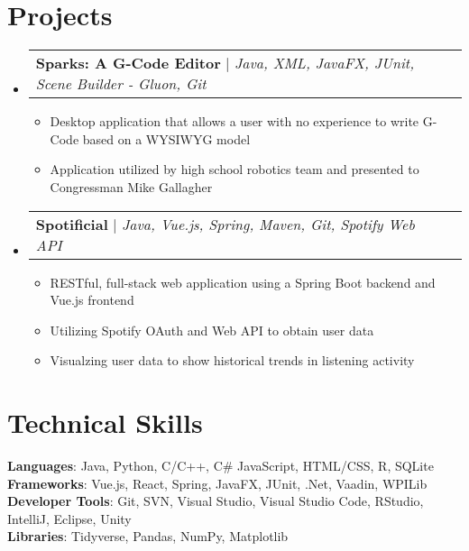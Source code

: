 \documentclass[letterpaper,11pt]{article}
\makeatletter
\newcommand{\resumeItem}[1]{
  \item\small{
    {#1 \vspace{-2pt}}
  }
}
\newcommand{\resumeProjectHeading}[2]{
    \item
    \begin{tabular*}{0.97\textwidth}{l@{\extracolsep{\fill}}r}
      \small#1 & #2 \\
    \end{tabular*}\vspace{-7pt}
}
\newcommand{\resumeSubHeadingListStart}{\begin{itemize}[leftmargin=0.15in, label={}]}
\newcommand{\resumeSubHeadingListEnd}{\end{itemize}}
\newcommand{\resumeItemListStart}{\begin{itemize}}
\newcommand{\resumeItemListEnd}{\end{itemize}\vspace{-5pt}}
\makeatother
\begin{document}
\section{{Projects}}
    \resumeSubHeadingListStart
      \resumeProjectHeading
          {\textbf{Sparks: A G-Code Editor} $|$ \emph{Java, XML, JavaFX, JUnit, Scene Builder - Gluon, Git}}{}
          \resumeItemListStart
            \resumeItem{Desktop application that allows a user with no experience to write G-Code based on a WYSIWYG model}
            \resumeItem{Application utilized by high school robotics team and presented to Congressman Mike Gallagher}
          \resumeItemListEnd
      \resumeProjectHeading
          {\textbf{Spotificial} $|$ \emph{Java, Vue.js, Spring, Maven, Git, Spotify Web API}}{}
          \resumeItemListStart
            \resumeItem{RESTful, full-stack web application using a Spring Boot backend and Vue.js frontend}
            \resumeItem{Utilizing Spotify OAuth and Web API to obtain user data}
            \resumeItem{Visualzing user data to show historical trends in listening activity}
          \resumeItemListEnd
    \resumeSubHeadingListEnd
%
\section{Technical Skills}
 \begin{itemize}[leftmargin=0.15in, label={}]
    \small{
    \item{
     \textbf{Languages}{: Java, Python, C/C++, C\# JavaScript, HTML/CSS, R, SQLite} \\
     \textbf{Frameworks}{: Vue.js, React, Spring, JavaFX, JUnit, .Net, Vaadin, WPILib} \\
     \textbf{Developer Tools}{: Git, SVN, Visual Studio, Visual Studio Code, RStudio, IntelliJ, Eclipse, Unity} \\
     \textbf{Libraries}{: Tidyverse, Pandas, NumPy, Matplotlib}
    }}
 \end{itemize}


\end{document}
